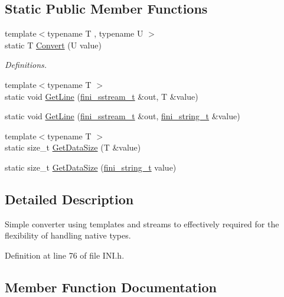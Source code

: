 \subsection*{Static Public Member Functions}
\begin{DoxyCompactItemize}
\item 
{\footnotesize template$<$typename T , typename U $>$ }\\static T \hyperlink{class_converters_a66daa93046e9633f8f123653255f9928}{Convert} (U value)
\begin{DoxyCompactList}\small\item\em Definitions. \end{DoxyCompactList}\item 
{\footnotesize template$<$typename T $>$ }\\static void \hyperlink{class_converters_a72160aa1d47892662d96f0046a46e01b}{Get\+Line} (\hyperlink{_i_n_i_8h_aff9f2d01dce7b38dcb4838bd5d1f84ed}{fini\+\_\+sstream\+\_\+t} \&out, T \&value)
\item 
static void \hyperlink{class_converters_ace1583e591c370bd2098ef172aaf9acb}{Get\+Line} (\hyperlink{_i_n_i_8h_aff9f2d01dce7b38dcb4838bd5d1f84ed}{fini\+\_\+sstream\+\_\+t} \&out, \hyperlink{_i_n_i_8h_a38d09ae9d340b15b8580649e578974db}{fini\+\_\+string\+\_\+t} \&value)
\item 
{\footnotesize template$<$typename T $>$ }\\static size\+\_\+t \hyperlink{class_converters_af9e5688c203b87ca43965f0f305e8b1d}{Get\+Data\+Size} (T \&value)
\item 
static size\+\_\+t \hyperlink{class_converters_a5219ad5e1e88370928402b149a55f19d}{Get\+Data\+Size} (\hyperlink{_i_n_i_8h_a38d09ae9d340b15b8580649e578974db}{fini\+\_\+string\+\_\+t} value)
\end{DoxyCompactItemize}


\subsection{Detailed Description}
Simple converter using templates and streams to effectively required for the flexibility of handling native types. 

Definition at line 76 of file I\+N\+I.\+h.



\subsection{Member Function Documentation}
\hypertarget{class_converters_a66daa93046e9633f8f123653255f9928}{}
